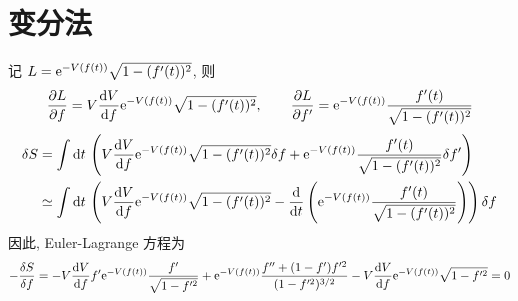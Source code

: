 \chapter{变分法}
\begin{solution}
    记 $L = \mathrm e^{-V(f(t))} \sqrt{1-(f'(t))^2}$, 则
    \[
        \frac{\partial L}{\partial f} = V \frac{\dd V}{\dd f} \mathrm e^{-V(f(t))} \sqrt{1-(f'(t))^2}, \qquad 
        \frac{\partial L}{\partial f'} = \mathrm e^{-V(f(t))} \frac{f'(t)}{\sqrt{1-(f'(t))^2}}
    \]
    \[
    \begin{aligned}
        \delta S &= \int \dd t\,\left(V \frac{\dd V}{\dd f} \mathrm e^{-V(f(t))} \sqrt{1-(f'(t))^2} \delta f + \mathrm e^{-V(f(t))} \frac{f'(t)}{\sqrt{1-(f'(t))^2}} \delta f'\right)\\
        &\simeq \int \dd t\,\left(V \frac{\dd V}{\dd f} \mathrm e^{-V(f(t))} \sqrt{1-(f'(t))^2} - \frac{\dd}{\dd t}\left(\mathrm e^{-V(f(t))} \frac{f'(t)}{\sqrt{1-(f'(t))^2}}\right)\right) \delta f
    \end{aligned}
    \]
    因此, Euler-Lagrange 方程为
    \[
        - \frac{\delta S}{\delta f} = - V \frac{\dd V}{\dd f} f' \mathrm e^{-V(f(t))} \frac{f'}{\sqrt{1-f'^2}} + \mathrm e^{-V(f(t))} \frac{f'' + (1-f')f'^2}{(1 - f'^2)^{3/2}} - V \frac{\dd V}{\dd f} \mathrm e^{- V(f(t))} \sqrt{1-f'^2} = 0
    \]
\end{solution}


